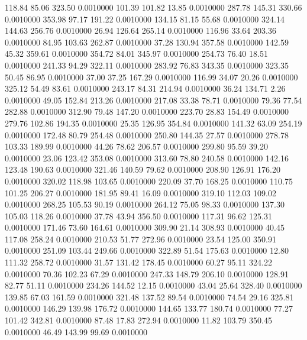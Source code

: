  118.84   85.06  323.50   0.0010000
 101.39  101.82   13.85   0.0010000
 287.78  145.31  330.66   0.0010000
 353.98   97.17  191.22   0.0010000
 134.15   81.15   55.68   0.0010000
 324.14  144.63  256.76   0.0010000
  26.94  126.64  265.14   0.0010000
 116.96   33.64  203.36   0.0010000
  84.95  103.63  262.87   0.0010000
  37.28  130.94  357.58   0.0010000
 142.59   45.32  359.61   0.0010000
 354.72   84.01  345.97   0.0010000
 254.73   76.40   18.51   0.0010000
 241.33   94.29  322.11   0.0010000
 283.92   76.83  343.35   0.0010000
 323.35   50.45   86.95   0.0010000
  37.00   37.25  167.29   0.0010000
 116.99   34.07   20.26   0.0010000
 325.12   54.49   83.61   0.0010000
 243.17   84.31  214.94   0.0010000
  36.24  134.71    2.26   0.0010000
  49.05  152.84  213.26   0.0010000
 217.08   33.38   78.71   0.0010000
  79.36   77.54  282.88   0.0010000
 312.90   79.48  147.20   0.0010000
 223.70   28.83  154.49   0.0010000
 279.76  102.86  194.35   0.0010000
  25.35  126.95  354.84   0.0010000
 141.32   63.09  254.19   0.0010000
 172.48   80.79  254.48   0.0010000
 250.80  144.35   27.57   0.0010000
 278.78  103.33  189.99   0.0010000
  44.26   78.62  206.57   0.0010000
 299.80   95.59   39.20   0.0010000
  23.06  123.42  353.08   0.0010000
 313.60   78.80  240.58   0.0010000
 142.16  123.48  190.63   0.0010000
 321.46  140.59   79.62   0.0010000
 208.90  126.91  176.20   0.0010000
 320.02  118.98  103.65   0.0010000
 220.09   37.70  168.25   0.0010000
 110.75  101.25  206.27   0.0010000
 181.95   89.41   16.09   0.0010000
 319.10  112.03  109.02   0.0010000
 268.25  105.53   90.19   0.0010000
 264.12   75.05   98.33   0.0010000
 137.30  105.03  118.26   0.0010000
  37.78   43.94  356.50   0.0010000
 117.31   96.62  125.31   0.0010000
 171.46   73.60  164.61   0.0010000
 309.90   21.14  308.93   0.0010000
  40.45  117.08  258.24   0.0010000
 210.53   51.77  272.96   0.0010000
  23.54  125.00  350.91   0.0010000
 251.09  103.44  249.66   0.0010000
 322.89   51.54  175.63   0.0010000
  12.80  111.32  258.72   0.0010000
  31.57  131.42  178.45   0.0010000
  60.27   95.11  324.22   0.0010000
  70.36  102.23   67.29   0.0010000
 247.33  148.79  206.10   0.0010000
 128.91   82.77   51.11   0.0010000
 234.26  144.52   12.15   0.0010000
  43.04   25.64  328.40   0.0010000
 139.85   67.03  161.59   0.0010000
 321.48  137.52   89.54   0.0010000
  74.54   29.16  325.81   0.0010000
 146.29  139.98  176.72   0.0010000
 144.65  133.77  180.74   0.0010000
  77.27  101.42  342.81   0.0010000
  87.48   17.83  272.94   0.0010000
  11.82  103.79  350.45   0.0010000
  46.49  143.99   99.69   0.0010000
